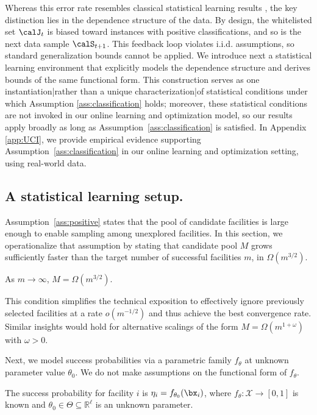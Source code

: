 \documentclass[blindrev]{informs3noheader}
\begin{document}
Whereas this error rate resembles classical statistical learning results \citep{boucheron2005theory, vapnik2015uniform, feldman2019high}, the key distinction lies in the dependence structure of the data. By design, the whitelisted set $\calJ_{t}$ is biased toward instances with positive classifications, and so is the next data sample $\calS_{t+1}$. This feedback loop violates i.i.d. assumptions, so standard generalization bounds cannot be applied. We introduce next a statistical learning environment that explicitly models the dependence structure and derives bounds of the same functional form. This construction serves as one instantiation|rather than a unique characterization|of statistical conditions under which Assumption \ref{ass:classification} holds; moreover, these statistical conditions are not invoked in our online learning and optimization model, so our results apply broadly as long as Assumption~\ref{ass:classification} is satisfied. In Appendix \ref{app:UCI}, we provide empirical evidence supporting Assumption~\ref{ass:classification} in our online learning and optimization setting, using real-world data.

\subsection{A statistical learning setup.}
\label{subsec:setup}

Assumption~\ref{ass:positive} states that the pool of candidate facilities is large enough to enable sampling among unexplored facilities. In this section, we operationalize that assumption by stating that candidate pool $M$ grows sufficiently faster than the target number of successful facilities $m$, in $\Omega(m^{3/2})$.
\begin{stat}
    \label{ass:regime}
   As $m \to \infty$, $M=\Omega(m^{3/2})$.
\end{stat}
This condition simplifies the technical exposition to effectively ignore previously selected facilities at a rate $o(m^{-1/2})$ and thus achieve the best convergence rate. Similar insights would hold for alternative scalings of the form $M=\Omega(m^{1+\omega})$ with $\omega>0$.

Next, we model success probabilities via a parametric family $f_\theta$ at unknown parameter value $\theta_0$. We do not make assumptions on the functional form of $f_\theta$.
\begin{stat}\label{ass:known}
The success probability for facility $i$ is $\eta_i = f_{\theta_0}(\bx_i)$, where $f_\theta:\mathcal X\to[0,1]$ is known and ${\theta_0}\in\Theta\subseteq\mathbb R^{\ell}$ is an unknown parameter.
\end{stat}
\end{document}
